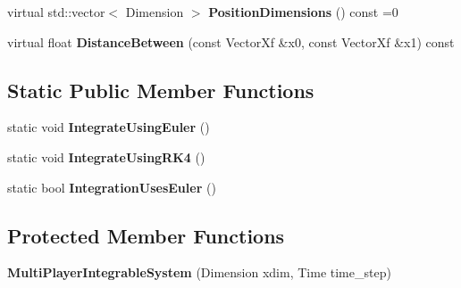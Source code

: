 \begin{DoxyCompactItemize}
\item 
virtual std\+::vector$<$ Dimension $>$ {\bfseries Position\+Dimensions} () const =0\hypertarget{classilqgames_1_1_multi_player_integrable_system_aa997a26ebcf8aaa4ec80b22fa996d574}{}\label{classilqgames_1_1_multi_player_integrable_system_aa997a26ebcf8aaa4ec80b22fa996d574}

\item 
virtual float {\bfseries Distance\+Between} (const Vector\+Xf \&x0, const Vector\+Xf \&x1) const \hypertarget{classilqgames_1_1_multi_player_integrable_system_af25dee45970bc4e53a3844084bc3fad4}{}\label{classilqgames_1_1_multi_player_integrable_system_af25dee45970bc4e53a3844084bc3fad4}

\end{DoxyCompactItemize}
\subsection*{Static Public Member Functions}
\begin{DoxyCompactItemize}
\item 
static void {\bfseries Integrate\+Using\+Euler} ()\hypertarget{classilqgames_1_1_multi_player_integrable_system_afbe59f8e51163913a0ef03b84bf6b33b}{}\label{classilqgames_1_1_multi_player_integrable_system_afbe59f8e51163913a0ef03b84bf6b33b}

\item 
static void {\bfseries Integrate\+Using\+R\+K4} ()\hypertarget{classilqgames_1_1_multi_player_integrable_system_a8623ddb41f2ea72b1838d5f8292fe091}{}\label{classilqgames_1_1_multi_player_integrable_system_a8623ddb41f2ea72b1838d5f8292fe091}

\item 
static bool {\bfseries Integration\+Uses\+Euler} ()\hypertarget{classilqgames_1_1_multi_player_integrable_system_a7d8d977e079520ad4eb6e2e38833b25c}{}\label{classilqgames_1_1_multi_player_integrable_system_a7d8d977e079520ad4eb6e2e38833b25c}

\end{DoxyCompactItemize}
\subsection*{Protected Member Functions}
\begin{DoxyCompactItemize}
\item 
{\bfseries Multi\+Player\+Integrable\+System} (Dimension xdim, Time time\+\_\+step)\hypertarget{classilqgames_1_1_multi_player_integrable_system_a7b66a8aa057ed007006d884b5fe333af}{}\label{classilqgames_1_1_multi_player_integrable_system_a7b66a8aa057ed007006d884b5fe333af}

\end{DoxyCompactItemize}

